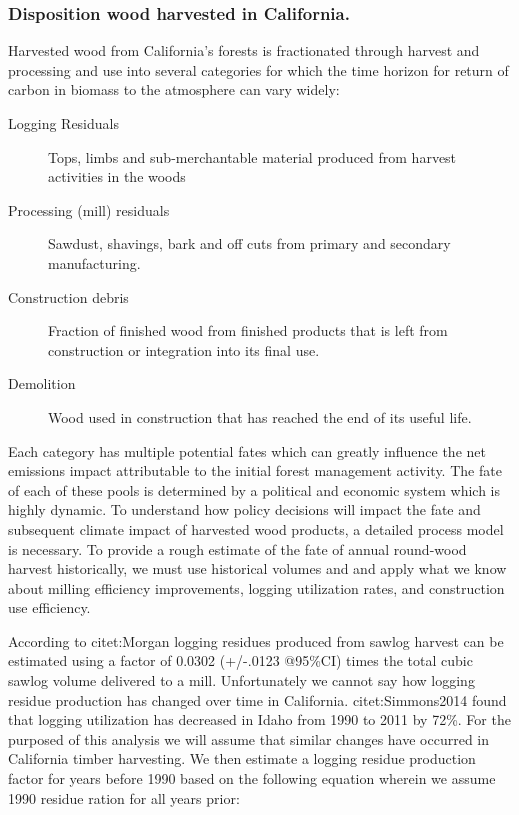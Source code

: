 \documentclass[a4paper]{article}
\begin{document}
\subsubsection{Disposition wood harvested in California.}
\label{sec-1-3-5}

Harvested wood from California's forests is fractionated through harvest and processing and use into several categories for which the time horizon for return of carbon in biomass to the atmosphere can vary widely:

\begin{description}
\item[{Logging Residuals}] Tops, limbs and sub-merchantable material produced from harvest activities in the woods
\item[{Processing (mill) residuals}] Sawdust, shavings, bark and off cuts from primary and secondary manufacturing.
\item[{Construction debris}] Fraction of finished wood from finished products that is left from construction or integration into its final use.
\item[{Demolition}] Wood used in construction that has reached the end of its useful life.
\end{description}

Each category has multiple potential fates which can greatly influence the net emissions impact attributable to the initial forest management activity.  The fate of each of these pools is determined by a political and economic system which is highly dynamic. To understand how policy decisions will impact the fate and subsequent climate impact of harvested wood products, a detailed process model is necessary. To provide a rough estimate of the fate of annual round-wood harvest historically, we must use historical volumes and and apply what we know about milling efficiency improvements, logging utilization rates, and construction use efficiency. 

According to citet:Morgan logging residues produced from sawlog harvest can be estimated using a factor of 0.0302 (+/-.0123 @95\%CI) times the total cubic sawlog volume delivered to a mill. Unfortunately we cannot say how logging residue production has changed over time in California.  citet:Simmons2014 found that logging utilization has decreased in Idaho from 1990 to 2011 by 72\%. For the purposed of this analysis we will assume that similar changes have occurred in California timber harvesting. We then estimate a logging residue production factor for years before 1990 based on the following equation wherein we assume 1990 residue ration for all years prior:
\end{document}
